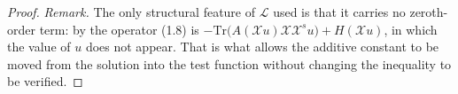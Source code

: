 \begin{proof}
\medskip\noindent\emph{Remark.} The only structural feature of $\mathcal L$ used is that it
carries no zeroth-order term: by  the operator (1.8) is
$-\mathrm{Tr}\big(A(\mathcal Xu)\mathcal X\mathcal X^{s}u\big)+H(\mathcal Xu)$, in which the
value of $u$ does not appear. That is what allows the additive constant to be moved from
the solution into the test function without changing the inequality to be verified.
\end{proof}
